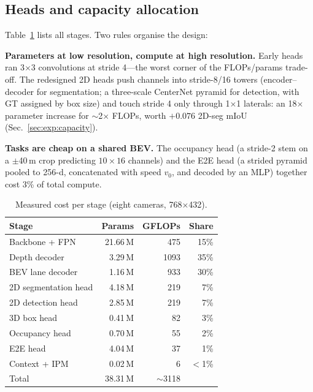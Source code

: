 \documentclass[10pt,twocolumn]{article}
\begin{document}
\subsection{Heads and capacity allocation}
Table~\ref{tab:cost} lists all stages. Two rules organise the design:

\textbf{Parameters at low resolution, compute at high resolution.} Early
heads ran 3$\times$3 convolutions at stride 4---the worst corner of the
FLOPs/params trade-off. The redesigned 2D heads push channels into
stride-8/16 towers (encoder--decoder for segmentation; a three-scale
CenterNet pyramid for detection, with GT assigned by box size) and touch
stride 4 only through 1$\times$1 laterals: an 18$\times$ parameter increase
for $\sim$2$\times$ FLOPs, worth $+0.076$ 2D-seg mIoU
(Sec.~\ref{sec:exp:capacity}).

\textbf{Tasks are cheap on a shared BEV.} The occupancy head (a stride-2 stem
on a $\pm$40\,m crop predicting $10{\times}16$ channels) and the E2E head (a
strided pyramid pooled to 256-d, concatenated with speed $v_0$, and decoded by
an MLP) together cost 3\% of total compute.

\begin{table}[t]
\centering\small
\caption{Measured cost per stage (eight cameras, 768$\times$432).}
\label{tab:cost}
\begin{tabular}{@{}lrrr@{}}
\toprule
Stage & Params & GFLOPs & Share\\
\midrule
Backbone + FPN & 21.66\,M & 475 & 15\%\\
Depth decoder & 3.29\,M & 1093 & 35\%\\
BEV lane decoder & 1.16\,M & 933 & 30\%\\
2D segmentation head & 4.18\,M & 219 & 7\%\\
2D detection head & 2.85\,M & 219 & 7\%\\
3D box head & 0.41\,M & 82 & 3\%\\
Occupancy head & 0.70\,M & 55 & 2\%\\
E2E head & 4.04\,M & 37 & 1\%\\
Context + IPM & 0.02\,M & 6 & $<$1\%\\
\midrule
Total & 38.31\,M & $\sim$3118 & \\
\bottomrule
\end{tabular}
\end{table}
\end{document}

